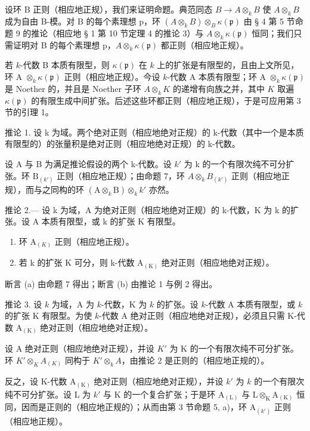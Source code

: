 设环 B 正则（相应地正规），我们来证明命题。典范同态 \(B \to A \otimes_{k} B\) 使 \(A \otimes_{k} B\) 成为自由 B-模。对 B 的每个素理想 p，环 \((A \otimes_{k} B) \otimes_{B} \kappa(\mathfrak{p})\) 由 § 4 第 5 节命题 9 的推论（相应地 § 1 第 10 节定理 4 的推论 3）与 \(A \otimes_{k} \kappa(\mathfrak{p})\) 恒同；我们只需证明对 B 的每个素理想 p，\(A \otimes_{k} \kappa(\mathfrak{p})\) 都正则（相应地正规）。

若 \(k\)-代数 B 本质有限型，则 \(\kappa(\mathfrak{p})\) 在 \(k\) 上的扩张是有限型的，且由上文所见，环 A \(\otimes_k \kappa(\mathfrak{p})\) 正则（相应地正规）。今设 \(k\)-代数 A 本质有限型；环 A \(\otimes_k \kappa(\mathfrak{p})\) 是 Noether 的，并且是 Noether 子环 \(A \otimes_k K\) 的递增有向族之并，其中 \(K\) 取遍 \(\kappa(\mathfrak{p})\) 的有限生成中间扩张。后述这些环都正则（相应地正规），于是可应用第 3 节的引理 1。

推论 1. 设 k 为域。两个绝对正则（相应地绝对正规）的 k-代数（其中一个是本质有限型的）的张量积是绝对正则（相应地绝对正规）的 k-代数。

设 A 与 B 为满足推论假设的两个 k-代数。设 \(k'\) 为 k 的一个有限次纯不可分扩张。环 \(\mathrm{B}_{(k')}\) 正则（相应地正规）；由命题 7，环 \(A \otimes_{k} B_{(k')}\) 正则（相应地正规），而与之同构的环 \((\mathrm{A} \otimes_{k} \mathrm{B}) \otimes_{k} k'\) 亦然。

推论 2.--- 设 k 为域，A 为绝对正则（相应地绝对正规）的 k-代数，K 为 k 的扩张。设 A 本质有限型，或 k 的扩张 K 有限型。

\begin{enumerate}
\def\labelenumi{\alph{enumi})}
\item
  环 \(\mathrm{A}_{(K)}\) 正则（相应地正规）。
\item
  若 k 的扩张 K 可分，则 k-代数 \(\mathrm{A}_{(\mathrm{K})}\) 绝对正则（相应地绝对正规）。
\end{enumerate}

断言 (a) 由命题 7 得出；断言 (b) 由推论 1 与例 2 得出。

推论 3. 设 \(k\) 为域，A 为 \(k\)-代数，K 为 \(k\) 的扩张。设 \(k\)-代数 A 本质有限型，或 \(k\) 的扩张 K 有限型。为使 \(k\)-代数 A 绝对正则（相应地绝对正规），必须且只需 K-代数 \(\mathrm{A}_{(\mathrm{K})}\) 绝对正则（相应地绝对正规）。

设 A 绝对正则（相应地绝对正规），并设 \(K'\) 为 K 的一个有限次纯不可分扩张。环 \(K'\otimes_{K}A_{(K)}\) 同构于 \(K'\otimes_{k}A\)，由推论 2 是正则的（相应地正规的）。

反之，设 K-代数 \(\mathrm{A}_{(\mathrm{K})}\) 绝对正则（相应地绝对正规），并设 \(k'\) 为 \(k\) 的一个有限次纯不可分扩张。设 L 为 \(k'\) 与 K 的一个复合扩张；于是环 \(\mathrm{A}_{(\mathrm{L})}\) 与 \(\mathrm{L} \otimes_{\mathrm{K}} \mathrm{A}_{(\mathrm{K})}\) 恒同，因而是正则的（相应地正规的）；从而由第 3 节命题 5, a)，环 \(\mathrm{A}_{(k')}\) 正则（相应地正规）。

